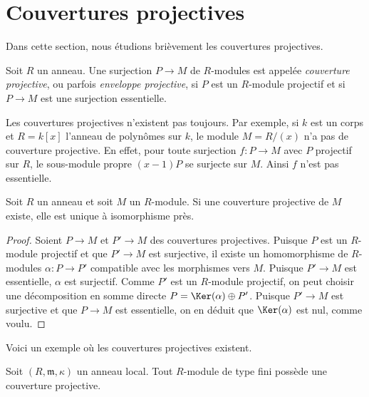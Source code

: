 \section{Couvertures projectives}
\label{section-projective-cover}

\noindent
Dans cette section, nous étudions brièvement les couvertures projectives.

\begin{definition}
\label{definition-projective-cover}
Soit $R$ un anneau. Une surjection $P \to M$ de $R$-modules est appelée
{\it couverture projective}, ou parfois {\it enveloppe projective},
si $P$ est un $R$-module projectif et si $P \to M$ est une surjection essentielle.
\end{definition}

\noindent
Les couvertures projectives n'existent pas toujours. Par exemple, si $k$
est un corps et $R = k[x]$ l'anneau de polynômes sur $k$, le module $M = R/(x)$
n'a pas de couverture projective. En effet, pour toute surjection $f : P \to M$
avec $P$ projectif sur $R$, le sous-module propre $(x - 1)P$ se surjecte
sur $M$. Ainsi $f$ n'est pas essentielle.

\begin{lemma}
\label{lemma-projective-cover-unique}
Soit $R$ un anneau et soit $M$ un $R$-module. Si une couverture projective
de $M$ existe, elle est unique à isomorphisme près.
\end{lemma}

\begin{proof}
Soient $P \to M$ et $P' \to M$ des couvertures projectives. Puisque $P$ est
un $R$-module projectif et que $P' \to M$ est surjective, il existe
un homomorphisme de $R$-modules $\alpha : P \to P'$ compatible avec les morphismes vers $M$.
Puisque $P' \to M$ est essentielle, $\alpha$ est surjectif.
Comme $P'$ est un $R$-module projectif, on peut choisir une décomposition
en somme directe $P = \Ker(\alpha) \oplus P'$. Puisque $P' \to M$ est surjective
et que $P \to M$ est essentielle, on en déduit que $\Ker(\alpha)$ est nul, comme voulu.
\end{proof}

\noindent
Voici un exemple où les couvertures projectives existent.

\begin{lemma}
\label{lemma-projective-covers-local}
Soit $(R, \mathfrak m, \kappa)$ un anneau local. Tout $R$-module de type fini possède
une couverture projective.
\end{lemma}

